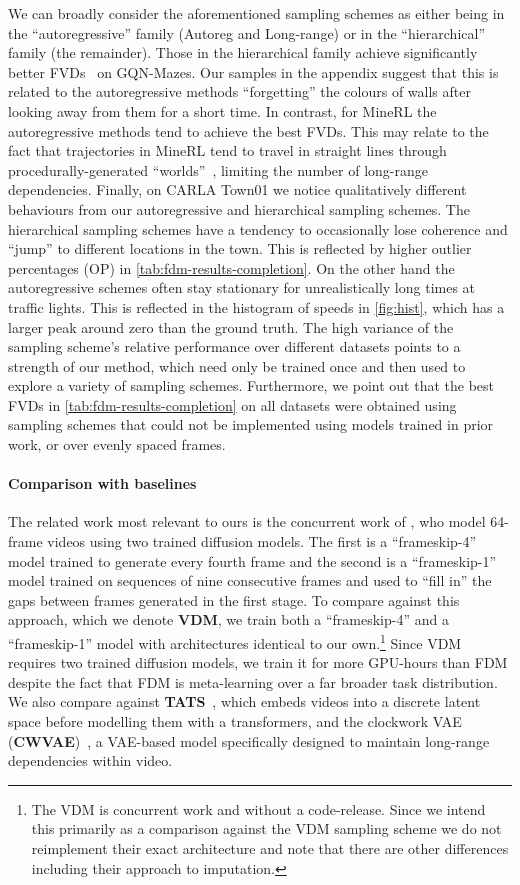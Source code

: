 We can broadly consider the aforementioned sampling schemes as either being in the ``autoregressive'' family (Autoreg and Long-range) or in the ``hierarchical'' family (the remainder). Those in the hierarchical family achieve significantly better FVDs~\cite{unterthiner2018towards} on GQN-Mazes. Our samples in the appendix suggest that this is related to the autoregressive methods ``forgetting'' the colours of walls after looking away from them for a short time. In contrast, for MineRL the autoregressive methods tend to achieve the best FVDs. This may relate to the fact that trajectories in MineRL tend to travel in straight lines through procedurally-generated ``worlds''~\cite{guss2019minerl,saxena2021clockwork}, limiting the number of long-range dependencies. 
Finally, on CARLA Town01 we notice qualitatively different behaviours from our autoregressive and hierarchical sampling schemes. The hierarchical
sampling schemes have a tendency to occasionally lose coherence and ``jump'' 
to different locations in the town. This is reflected by higher outlier percentages (OP) in \cref{tab:fdm-results-completion}. On the other hand the autoregressive schemes often stay stationary for unrealistically long times at traffic lights. This is reflected in the histogram of speeds in \cref{fig:hist}, which has a larger peak around zero than the ground truth. The high variance of the sampling scheme's relative performance over different datasets points to a strength of our method, which need only be trained once and then used to explore a variety of sampling schemes. Furthermore, we point out that the best FVDs in \cref{tab:fdm-results-completion} on all datasets were obtained using sampling schemes that could not be implemented using models trained in prior work, or over evenly spaced frames.

\paragraph{Comparison with baselines}
The related work most relevant to ours is the concurrent work of \citet{ho2022video}, who model 64-frame videos using two trained diffusion models. The first is a ``frameskip-4'' model trained to generate every fourth frame and the second is a ``frameskip-1'' model trained on sequences of nine consecutive frames and used to ``fill in'' the gaps between frames generated in the first stage. To compare against this approach, which we denote \textbf{VDM}, we train both a ``frameskip-4'' and a ``frameskip-1'' model with architectures identical to our own.\footnote{The VDM is concurrent work and without a code-release. Since we intend this primarily as a comparison against the VDM sampling scheme we do not reimplement their exact architecture and note that there are other differences including their approach to imputation.} Since VDM requires two trained diffusion models, we train it for more GPU-hours than FDM despite the fact that FDM is meta-learning over a far broader task distribution. We also compare against \textbf{TATS}~\citep{ge2022long}, which embeds videos into a discrete latent space before modelling them with a transformers, and the clockwork VAE (\textbf{CWVAE})~\citep{saxena2021clockwork}, a VAE-based model specifically designed to maintain long-range dependencies within video.

